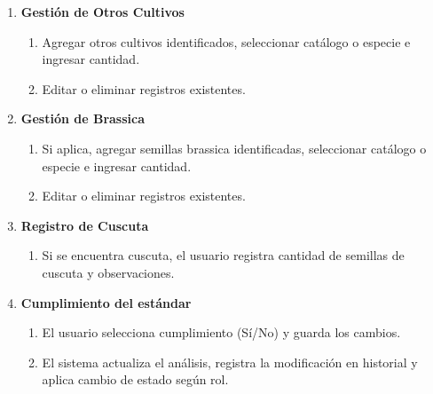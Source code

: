 \begin{enumerate}[nosep]
    \item \textbf{Gestión de Otros Cultivos}
    \begin{enumerate}[nosep]
        \item Agregar otros cultivos identificados, seleccionar catálogo o especie e ingresar cantidad.
        \item Editar o eliminar registros existentes.
    \end{enumerate}

    \item \textbf{Gestión de Brassica}
    \begin{enumerate}[nosep]
        \item Si aplica, agregar semillas brassica identificadas, seleccionar catálogo o especie e ingresar cantidad.
        \item Editar o eliminar registros existentes.
    \end{enumerate}

    \item \textbf{Registro de Cuscuta}
    \begin{enumerate}[nosep]
        \item Si se encuentra cuscuta, el usuario registra cantidad de semillas de cuscuta y observaciones.
    \end{enumerate}

    \item \textbf{Cumplimiento del estándar}
    \begin{enumerate}[nosep]
        \item El usuario selecciona cumplimiento (Sí/No) y guarda los cambios.
        \item El sistema actualiza el análisis, registra la modificación en historial y aplica cambio de estado según rol.
    \end{enumerate}
\end{enumerate}

